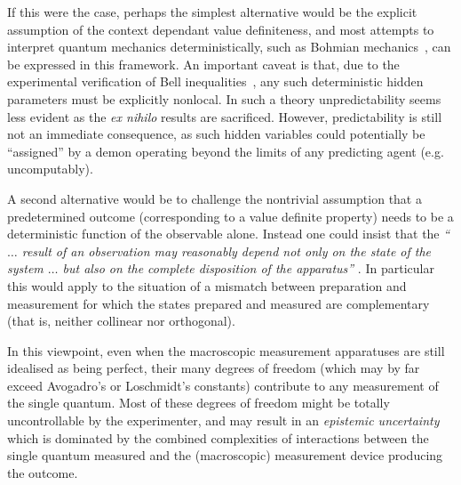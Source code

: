 \documentclass[%
 superscriptaddress,
 preprint,
 showpacs,
 showkeys,
 preprintnumbers,
  amsmath,amssymb,
  aps,
 pra,
  longbibliography,
  floatfix,
 ]{revtex4-1}
\theoremstyle{definition}
\begin{document}
If this were the case, perhaps the simplest alternative would be the explicit assumption of the context dependant value definiteness, and most attempts to interpret quantum mechanics deterministically, such as Bohmian mechanics~\cite{Bohm52}, can be expressed in this framework.
An important caveat is that, due to the experimental verification of Bell inequalities~\cite{wjswz-98},
any such deterministic hidden parameters must be explicitly nonlocal.
In such a theory unpredictability seems less evident as the \emph{ex nihilo} results are sacrificed.
However, predictability is still not an immediate consequence, as such hidden variables could potentially be ``assigned'' by a demon operating beyond the limits of any predicting agent (e.g. uncomputably).


A second alternative would be to challenge the
nontrivial assumption that a predetermined outcome  (corresponding to a value definite property) needs to be a deterministic function of the observable alone.
Instead one could insist that the
{\em ``$\ldots$ result of an observation may reasonably depend not only on the state of the system  $\ldots$ but also on the complete disposition  of the apparatus''} \cite[Sec.~5]{bell-66}.
In particular this would apply to the situation of a mismatch between preparation and measurement for which the states prepared and measured are complementary (that is, neither collinear nor orthogonal).

In this viewpoint, even when the macroscopic measurement apparatuses are still idealised as being perfect, their many degrees of freedom (which may by far exceed Avogadro's  or Loschmidt's constants) contribute to any measurement of the single quantum.
Most of these degrees of freedom might be totally uncontrollable by the experimenter, and may result in an {\em epistemic uncertainty} which is dominated by the combined complexities of interactions between the single quantum measured and the (macroscopic) measurement device producing the outcome.
\end{document}
